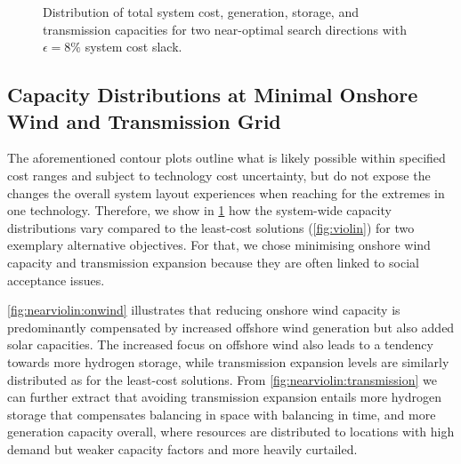 \begin{figure}
    \noindent{}
    \caption{
      Distribution of total system cost, generation, storage, and transmission capacities
      for two near-optimal search directions with $\epsilon=8\%$ system cost slack.
    }
    \label{fig:nearviolin}
\end{figure}

\subsection{Capacity Distributions at Minimal Onshore Wind and Transmission Grid}

The aforementioned contour plots  outline
what is likely possible within specified cost ranges and subject to technology cost uncertainty,
but do not expose
the changes the overall system layout experiences when reaching for the extremes in one technology.
Therefore, we show in \cref{fig:nearviolin} how the system-wide capacity distributions vary
compared to the least-cost solutions (\cref{fig:violin}) for two exemplary alternative objectives.
For that, we chose minimising onshore wind capacity and transmission expansion
because they are often linked to social acceptance issues.

\cref{fig:nearviolin:onwind} illustrates that reducing onshore wind capacity is
predominantly compensated by increased offshore wind generation but also added solar capacities.
The increased focus on offshore wind also leads to a tendency towards more hydrogen storage,
while transmission expansion levels are similarly distributed as for the least-cost solutions.
From \cref{fig:nearviolin:transmission} we can further extract that avoiding transmission expansion entails
more hydrogen storage that compensates balancing in space with balancing in time,
and more generation capacity overall, where resources are distributed to locations with
high demand but weaker capacity factors and more heavily curtailed.

